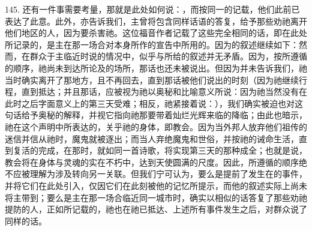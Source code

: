 145. 还有一件事需要考量，那就是此处如何说：，而按同一的记载，他们此前已表达了此意。此外，亦告诉我们，主曾将包含同样话语的答复，给予那些劝祂离开他们地区的人，因为要杀害祂。这位福音作者记载了这些完全相同的话，即在此处所记录的，是主在那一场合对本身所作的宣告中所用的。因为的叙述继续如下：然而，在群众于主临近时说的情况中，似乎与所给的叙述并无矛盾。因为，按所遵循的顺序，祂尚未到达所论及的场所，那话也还未被说出。但因为并未告诉我们，祂当时确实离开了那地方，且不再回去，直到那话被他们说出的时刻（因为祂继续行程，直到抵达；并且那话，应被视为祂以奥秘和比喻意义所说：因为祂当然没有在此时之后字面意义上的第三天受难；相反，祂紧接着说：），我们确实被迫也对这句话给予奥秘的解释，并视它指向祂那要带着灿烂光辉来临的降临；由此也暗示，祂在这个声明中所表达的，关乎祂的身体，即教会。因为当外邦人放弃他们祖传的迷信并信从祂时，魔鬼就被逐出；而当人弃绝魔鬼和世俗，并按祂的诫命生活，直到复活的完成，在那时，就如同一首诗歌，将实现第三天的那种成全；也就是说，教会将在身体与灵魂的实在不朽中，达到天使圆满的尺度。因此，所遵循的顺序绝不应被理解为涉及转向另一关联。但我们宁可认为，要么是提前了发生在的事件，并将它们在此处引入，仅因它们在此刻被他的记忆所提示，而他的叙述实际上尚未将主带到；要么是主在那一场合临近同一城市时，确实以相似的话答复了那些劝祂提防的人，正如所记载的，祂也在祂已抵达、上述所有事件发生之后，对群众说了同样的话。\par


